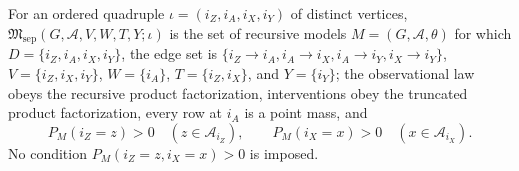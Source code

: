For an ordered quadruple \(\iota=(i_Z,i_A,i_X,i_Y)\) of distinct
vertices, \(\mathfrak M_{\mathrm{sep}}(G,\mathcal A,V,W,T,Y;\iota)\) is
the set of recursive models \(M=(G,\mathcal A,\theta)\) for which
\(D=\{i_Z,i_A,i_X,i_Y\}\), the edge set is
\(\{i_Z\to i_A,i_A\to i_X,i_A\to i_Y,i_X\to i_Y\}\),
\(V=\{i_Z,i_X,i_Y\}\), \(W=\{i_A\}\),
\(T=\{i_Z,i_X\}\), and \(Y=\{i_Y\}\); the observational law obeys the
recursive product factorization, interventions obey the truncated product
factorization, every row at \(i_A\) is a point mass, and
\[
 P_M(i_Z=z)>0\quad(z\in\mathcal A_{i_Z}),
 \qquad
 P_M(i_X=x)>0\quad(x\in\mathcal A_{i_X}).
\]
No condition \(P_M(i_Z=z,i_X=x)>0\) is imposed.